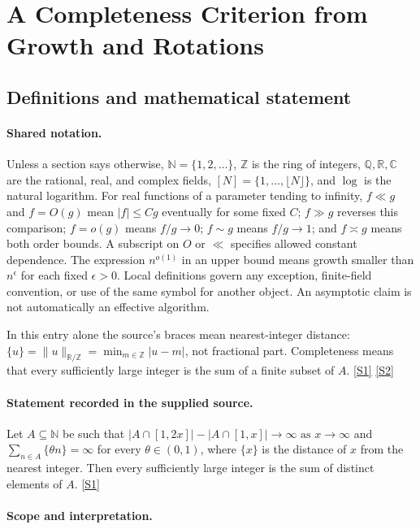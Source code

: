 \documentclass[11pt,a4paper]{article}
\newcommand{\N}{\mathbb{N}}
\newcommand{\Z}{\mathbb{Z}}
\newcommand{\Q}{\mathbb{Q}}
\newcommand{\R}{\mathbb{R}}
\newcommand{\C}{\mathbb{C}}
\newcommand{\sref}[2]{\hyperlink{source:#1:#2}{[S#2]}}
\begin{document}
\section{A Completeness Criterion from Growth and Rotations}\label{statement}


\subsection{Definitions and mathematical statement}

\paragraph{Shared notation.}Unless a section says otherwise, $\N=\{1,2,\ldots\}$,
$\Z$ is the ring of integers, $\Q,\R,\C$ are the rational, real, and complex
fields, $[N]=\{1,\ldots,\lfloor N\rfloor\}$, and $\log$ is the natural
logarithm. For real functions of a parameter tending to infinity,
$f\ll g$ and $f=O(g)$ mean $|f|\leq Cg$ eventually for some fixed $C$;
$f\gg g$ reverses this comparison; $f=o(g)$ means $f/g\to0$;
$f\sim g$ means $f/g\to1$; and $f\asymp g$ means both order bounds.
A subscript on $O$ or $\ll$ specifies allowed constant dependence.
The expression $n^{o(1)}$ in an upper bound means growth smaller than
$n^\epsilon$ for each fixed $\epsilon>0$. Local definitions govern any
exception, finite-field convention, or use of the same symbol for another
object. An asymptotic claim is not automatically an effective algorithm.



In this entry alone the source's braces mean nearest-integer distance: $\{u\}=\|u\|_{\R/\Z}=\min_{m\in\Z}|u-m|$, not fractional part. Completeness means that every sufficiently large integer is the sum of a finite subset of $A$. \sref{statement}{1} \sref{statement}{2}

\paragraph{Statement recorded in the supplied source.}
Let $A\subseteq \mathbb{N}$ be such that $ \lvert A\cap [1,2x]\rvert -\lvert A\cap [1,x]\rvert \to \infty\textrm{ as }x\to \infty $ and $ \sum_{n\in A} \{ \theta n\}=\infty $ for every $\theta\in (0,1)$, where $\{x\}$ is the distance of $x$ from the nearest integer. Then every sufficiently large integer is the sum of distinct elements of $A$. \sref{statement}{1}

\paragraph{Scope and interpretation.}
\end{document}

